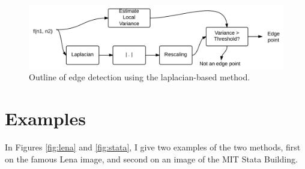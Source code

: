 \documentclass[12pt]{amsart}
\begin{document}
\begin{figure}
\centering
\includegraphics[width=\linewidth]{LaplacianMethod.png}
\caption{Outline of edge detection using the laplacian-based method.}
\label{fig:laplacianmethod}
\end{figure}

\section{Examples}

In Figures \ref{fig:lena} and \ref{fig:stata}, I give two examples of the two methods, first on the famous Lena image, and second on an image of the MIT Stata Building.
\end{document}
